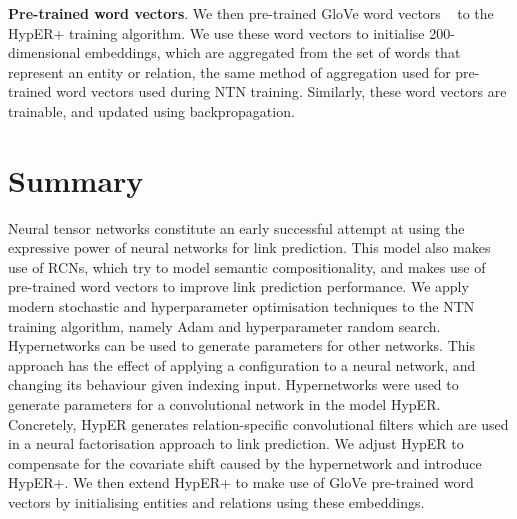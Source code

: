 \noindent \textbf{Pre-trained word vectors}. We then pre-trained GloVe word vectors \unskip ~\citep{pennington2014glove} to the HypER+ training algorithm. We use these word vectors to initialise  200-dimensional embeddings, which are aggregated from the set of words that represent an entity or relation, the same method of aggregation used for pre-trained word vectors used during NTN training. Similarly, these word vectors are trainable, and updated using backpropagation.  


\section{Summary}

Neural tensor networks constitute an early successful attempt at using the expressive power of neural networks for link prediction. This model also makes use of RCNs, which try to model semantic compositionality, and makes use of pre-trained word vectors to improve link prediction performance. We apply modern stochastic and hyperparameter optimisation techniques to the NTN training algorithm, namely Adam and hyperparameter random search. \newline
Hypernetworks can be used to generate parameters for other networks. This approach has the effect of applying a configuration to a neural network, and changing its behaviour given indexing input. Hypernetworks were used to generate parameters for a convolutional network in the model HypER. Concretely, HypER generates relation-specific convolutional filters which are used in a neural factorisation approach to link prediction. We adjust HypER to compensate for the covariate shift caused by the hypernetwork and introduce HypER+. We then extend HypER+ to make use of GloVe pre-trained word vectors by initialising entities and relations using these embeddings. \newline

